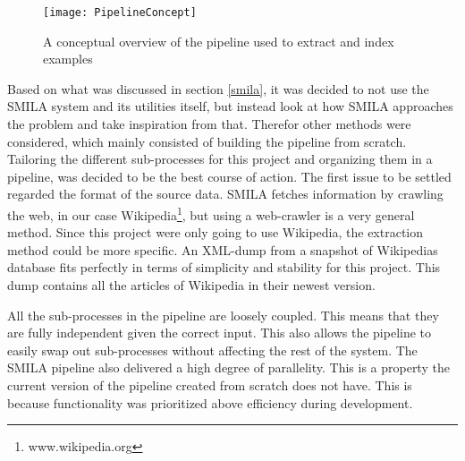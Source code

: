 
\begin{figure}[h]
\caption{A conceptual overview of the pipeline used to extract and index examples}
\texttt{[image: PipelineConcept]}
\end{figure}



Based on what was discussed in section \ref{smila}, it was decided to not use the SMILA system and its utilities itself, but instead look at how SMILA approaches the problem and take inspiration from that. Therefor other methods were considered, which mainly consisted of building the pipeline from scratch. Tailoring the different sub-processes for this project and organizing them in a pipeline, was decided to be the best course of action. The first issue to be settled regarded the format of the source data. SMILA fetches information by crawling the web, in our case Wikipedia\footnote{www.wikipedia.org}, but using a web-crawler is a very general method. Since this project were only going to use Wikipedia, the extraction method could be more specific. An XML-dump from a snapshot of Wikipedias database fits perfectly in terms of simplicity and stability for this project. This dump contains all the articles of Wikipedia in their newest version.


All the sub-processes in the pipeline are loosely coupled. This means that they are fully independent given the correct input. This also allows the pipeline to easily swap out sub-processes without affecting the rest of the system. The SMILA pipeline also delivered a high degree of parallelity. This is a property the current version of the pipeline created from scratch does not have. This is because functionality was prioritized above efficiency during development. 

